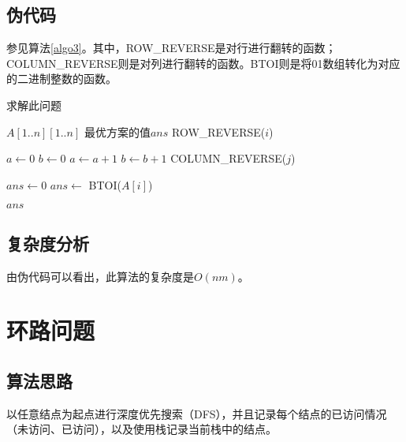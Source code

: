\documentclass[UTF8]{ctexart}
\begin{document}
    \subsection*{伪代码}
    参见算法\ref{algo3}。其中，ROW\_REVERSE是对行进行翻转的函数；COLUMN\_REVERSE则是对列进行翻转的函数。BTOI则是将01数组转化为对应的二进制整数的函数。
        \begin{algorithm}
            \caption{求解此问题}
            \begin{algorithmic}[1]
                \Require $A[1..n][1..n]$
                \Ensure 最优方案的值$ans$
                            \State ROW\_REVERSE($i$)
                        \EndIf
                    \EndFor

                        \State $a \gets 0$
                        \State $b \gets 0$
                                \State $a \gets a+1$
                            \Else
                                \State $b \gets b+1$
                            \EndIf
                        \EndFor
                            \State COLUMN\_REVERSE($j$)
                        \EndIf
                    \EndFor

                    \State $ans \gets 0$
                        \State $ans \gets$ BTOI($A[i]$)
                    \EndFor

                    \State \Return $ans$
                \EndFunction
            \end{algorithmic}
            \label{algo3}
        \end{algorithm}

    \subsection*{复杂度分析}
    由伪代码可以看出，此算法的复杂度是$O(nm)$。

\section{环路问题} %
    \subsection*{算法思路}
        以任意结点为起点进行深度优先搜索（DFS），并且记录每个结点的已访问情况（未访问、已访问），以及使用栈记录当前栈中的结点。
\end{document}
